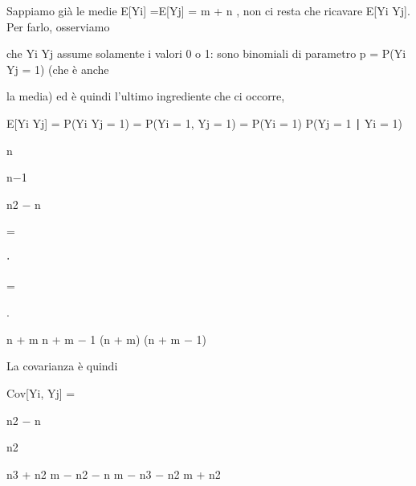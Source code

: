\documentclass[a4paper,portrait,12pt]{article}
\begin{document}
\begin{flushleft}
Sappiamo gi\`{a} le medie E[Yi] =E[Yj] = m + n , non ci resta che ricavare E[Yi Yj]. Per farlo, osserviamo
\end{flushleft}


\begin{flushleft}
che Yi Yj assume solamente i valori 0 o 1: sono binomiali di parametro p = P(Yi Yj = 1) (che \`{e} anche
\end{flushleft}


\begin{flushleft}
la media) ed \`{e} quindi l'ultimo ingrediente che ci occorre,
\end{flushleft}


\begin{flushleft}
E[Yi Yj] = P(Yi Yj = 1) = P(Yi = 1, Yj = 1) = P(Yi = 1) P(Yj = 1 ∣ Yi = 1)
\end{flushleft}


\begin{flushleft}
n
\end{flushleft}


\begin{flushleft}
n$-$1
\end{flushleft}


\begin{flushleft}
n2 $-$ n
\end{flushleft}


=


⋅


=


.


\begin{flushleft}
n + m n + m $-$ 1 (n + m) (n + m $-$ 1)
\end{flushleft}


\begin{flushleft}
La covarianza \`{e} quindi
\end{flushleft}


\begin{flushleft}
Cov[Yi, Yj] =
\end{flushleft}





\begin{flushleft}
n2 $-$ n
\end{flushleft}


\begin{flushleft}
n2
\end{flushleft}


\begin{flushleft}
n3 + n2 m $-$ n2 $-$ n m $-$ n3 $-$ n2 m + n2
\end{flushleft}
\end{document}
